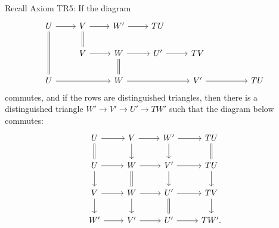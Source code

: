 \documentclass[12pt]{article}%
\theoremstyle{remark}
\theoremstyle{definition}
\begin{document}
Recall Axiom TR5: If the diagram 
$$
\begin{tikzcd}
U\ar[equal]{dd}\ar{r}&V\ar[equal]{d}\ar{r}&W'\ar{r}&TU\\
&V\ar{r}&W\ar[equal]{d}\ar{r}&U'\ar{r}&TV\\
U\ar{rr}&&W\ar{rr}&&V'\ar{rr}&&TU
\end{tikzcd}
$$
commutes, and if the rows are distinguished triangles, then there is a distinguished triangle $W'\to V'\to U'\to TW'$ such that the diagram below commutes:
$$
\begin{tikzcd}
U\ar{r}\ar[equal]{d}&V\ar{d}\ar{r}&W'\ar{d}\ar{r}&TU\ar[equal]{d}\\
U\ar{d}\ar{r}&W\ar{r}\ar[equal]{d}&V'\ar{d}\ar{r}&TU\ar{d}\\
V\ar{d}\ar{r}&W\ar{d}\ar{r}&U'\ar{r}\ar[equal]{d}&TV\ar{d}\\
W'\ar{r}&V'\ar{r}&U'\ar{r}&TW'.
\end{tikzcd}
$$
\end{document}

